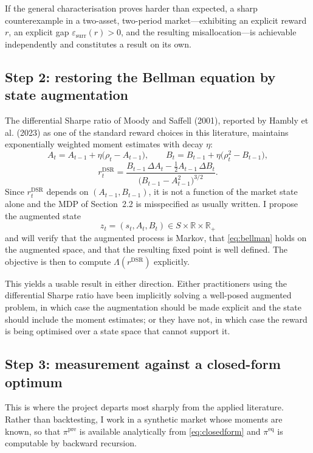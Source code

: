 \documentclass[11pt,a4paper]{article}
\theoremstyle{plain}
\theoremstyle{definition}
\newcommand{\R}{\mathbb{R}}
\newcommand{\pipre}{\pi^{\mathrm{pre}}}
\newcommand{\pieq}{\pi^{\mathrm{eq}}}
\newcommand{\epssurr}{\varepsilon_{\mathrm{surr}}}
\begin{document}
If the general characterisation proves harder than expected, a sharp counterexample in a
two-asset, two-period market---exhibiting an explicit reward $r$, an explicit gap
$\epssurr(r)>0$, and the resulting misallocation---is achievable independently and
constitutes a result on its own.

\subsection{Step 2: restoring the Bellman equation by state augmentation}

The differential Sharpe ratio of Moody and Saffell (2001), reported by
Hambly et al. (2023) as one of the standard reward choices in this literature,
maintains exponentially weighted moment estimates with decay $\eta$:
\begin{equation}
A_t=A_{t-1}+\eta\bigl(\rho_t-A_{t-1}\bigr),
\qquad
B_t=B_{t-1}+\eta\bigl(\rho_t^2-B_{t-1}\bigr),
\end{equation}
\begin{equation}
r_t^{\mathrm{DSR}}=\frac{B_{t-1}\,\Delta A_t-\tfrac12 A_{t-1}\,\Delta B_t}
{\bigl(B_{t-1}-A_{t-1}^2\bigr)^{3/2}}.
\end{equation}
Since $r_t^{\mathrm{DSR}}$ depends on $(A_{t-1},B_{t-1})$, it is not a function of the
market state alone and the MDP of Section~2.2 is misspecified as usually written. I
propose the augmented state
\begin{equation}
z_t=(s_t,A_t,B_t)\in S\times\R\times\R_+
\end{equation}
and will verify that the augmented process is Markov, that \eqref{eq:bellman} holds on
the augmented space, and that the resulting fixed point is well defined. The objective
is then to compute $\Lambda(r^{\mathrm{DSR}})$ explicitly.

This yields a usable result in either direction. Either practitioners using the
differential Sharpe ratio have been implicitly solving a well-posed augmented problem,
in which case the augmentation should be made explicit and the state should include the
moment estimates; or they have not, in which case the reward is being optimised over a
state space that cannot support it.

\subsection{Step 3: measurement against a closed-form optimum}

This is where the project departs most sharply from the applied literature. Rather than
backtesting, I work in a synthetic market whose moments are known, so that $\pipre$ is
available analytically from \eqref{eq:closedform} and $\pieq$ is computable by backward
recursion.
\end{document}
